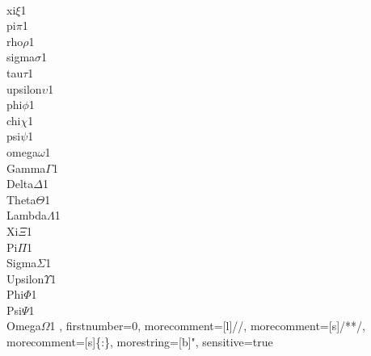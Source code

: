 {        {\\xi}{$\xi$}1
        {\\pi}{$\pi$}1
        {\\rho}{$\rho$}1
        {\\sigma}{$\sigma$}1
        {\\tau}{$\tau$}1
        {\\upsilon}{$\upsilon$}1
        {\\phi}{$\phi$}1
        {\\chi}{$\chi$}1
        {\\psi}{$\psi$}1
        {\\omega}{$\omega$}1
        {\\Gamma}{$\Gamma$}1
        {\\Delta}{$\Delta$}1
        {\\Theta}{$\Theta$}1
        {\\Lambda}{$\Lambda$}1
        {\\Xi}{$\Xi$}1
        {\\Pi}{$\Pi$}1
        {\\Sigma}{$\Sigma$}1
        {\\Upsilon}{$\Upsilon$}1
        {\\Phi}{$\Phi$}1
        {\\Psi}{$\Psi$}1
        {\\Omega}{$\Omega$}1
    ,
    firstnumber=0,
    morecomment=[l]{//},
    morecomment=[s]{/*}{*/},
    morecomment=[s]{\{:}{\}},
    morestring=[b]",
    sensitive=true
}
